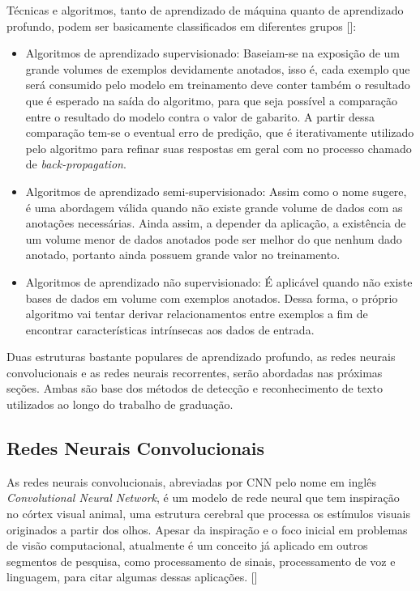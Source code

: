Técnicas e algoritmos, tanto de aprendizado de máquina quanto de aprendizado profundo, podem ser basicamente classificados em diferentes grupos []:
\begin{itemize}
    \item Algoritmos de aprendizado supervisionado: Baseiam-se na exposição de um grande volumes de exemplos devidamente anotados, isso é, cada exemplo que será consumido pelo modelo em treinamento deve conter também o resultado que é esperado na saída do algoritmo, para que seja possível a comparação entre o resultado do modelo contra o valor de gabarito. A partir dessa comparação tem-se o eventual erro de predição, que é iterativamente utilizado pelo algoritmo para refinar suas respostas em geral com no processo chamado de \textit{back-propagation}.
    \item Algoritmos de aprendizado semi-supervisionado: Assim como o nome sugere, é uma abordagem válida quando não existe grande volume de dados com as anotações necessárias. Ainda assim, a depender da aplicação, a existência de um volume menor de dados anotados pode ser melhor do que nenhum dado anotado, portanto ainda possuem grande valor no treinamento.
    \item Algoritmos de aprendizado não supervisionado: É aplicável quando não existe bases de dados em volume com exemplos anotados. Dessa forma, o próprio algoritmo vai tentar derivar relacionamentos entre exemplos a fim de encontrar características intrínsecas aos dados de entrada.
\end{itemize}

Duas estruturas bastante populares de aprendizado profundo, as redes neurais convolucionais e as redes neurais recorrentes, serão abordadas nas próximas seções. Ambas são base dos métodos de detecção e reconhecimento de texto utilizados ao longo do trabalho de graduação.


\subsection{Redes Neurais Convolucionais}
As redes neurais convolucionais, abreviadas por CNN pelo nome em inglês \textit{Convolutional Neural Network}, é um modelo de rede neural que tem inspiração no córtex visual animal, uma estrutura cerebral que processa os estímulos visuais originados a partir dos olhos. Apesar da inspiração e o foco inicial em problemas de visão computacional, atualmente é um conceito já aplicado em outros segmentos de pesquisa, como processamento de sinais, processamento de voz e linguagem, para citar algumas dessas aplicações. []

